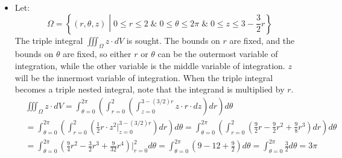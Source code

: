 \documentclass{article}
\begin{document}
\begin{itemize}
\item Let:
\[\Omega = \left\{(r,\theta,z) \middle| 0 \leq r \leq 2 \;\&\; 0 \leq \theta \leq 2\pi \;\&\; 0 \leq z \leq 3 - \frac{3}{2}r \right\}\]
The triple integral \(\iiint_{\Omega}z \cdot dV\) is sought. The bounds on \(r\) are fixed, and the bounds on \(\theta\) are fixed, so either \(r\) or \(\theta\) can be the outermost variable of integration, while the other variable is the middle variable of integration. \(z\) will be the innermost variable of integration. When the triple integral becomes a triple nested integral, note that the integrand is multiplied by \(r\).
\begin{align*}
& \iiint_{\Omega} z \cdot dV 
= \int_{\theta = 0}^{2\pi} \left(\int_{r = 0}^2 \left(\int_{z = 0}^{3 - (3/2)r} z \cdot r \cdot dz\right)dr\right)d\theta \\ 
& = \int_{\theta = 0}^{2\pi} \left(\int_{r = 0}^2 \left(\frac{1}{2}r \cdot z^2\Big|_{z = 0}^{3 - (3/2)r}\right)dr\right)d\theta 
= \int_{\theta = 0}^{2\pi} \left(\int_{r = 0}^2 \left(\frac{9}{2}r - \frac{9}{2}r^2 + \frac{9}{8}r^3\right)dr\right)d\theta \\
& = \int_{\theta = 0}^{2\pi} \left(\frac{9}{4}r^2 - \frac{3}{2}r^3 + \frac{9}{32}r^4\right)\bigg|_{r=0}^2 d\theta 
= \int_{\theta = 0}^{2\pi} \left(9 - 12 + \frac{9}{2}\right)d\theta 
= \int_{\theta = 0}^{2\pi} \frac{3}{2}d\theta 
= 3\pi
\end{align*}
 


\end{itemize}
\end{document}
